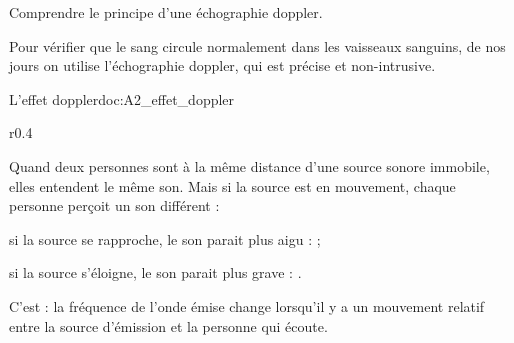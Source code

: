 \teteTermStssImag



\begin{objectifs}
  \item Comprendre le principe d'une échographie doppler.
\end{objectifs}

\begin{contexte}
  Pour vérifier que le sang circule normalement dans les vaisseaux sanguins, de nos jours on utilise l'échographie doppler, qui est précise et non-intrusive.
  
\end{contexte}


\begin{doc}{L'effet doppler}{doc:A2_effet_doppler}
  \begin{wrapfigure}[4]{r}{0.4\linewidth}
    \centering
    \vspace*{-35pt}
  \end{wrapfigure}
  
  Quand deux personnes sont à la même distance d'une source sonore immobile, elles entendent le même son.
  Mais si la source est en mouvement, chaque personne perçoit un son différent :
  \begin{listePoints}
    \item si la source se rapproche, le son parait plus aigu :  ;
    \item si la source s'éloigne, le son parait plus grave : .
  \end{listePoints}
  
  \begin{encart}  
    C'est  : la fréquence de l'onde émise change lorsqu'il y a un mouvement relatif entre la source d'émission et la personne qui écoute.
  \end{encart}
\end{doc}



